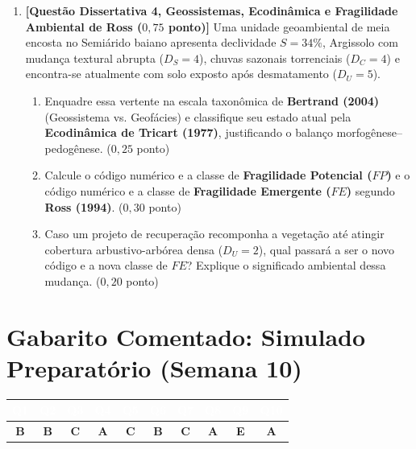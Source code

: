\begin{enumerate}[leftmargin=1.8em, itemsep=6pt, resume]
  \item \textbf{[Questão Dissertativa 4, Geossistemas, Ecodinâmica e Fragilidade Ambiental de Ross ($0{,}75$ ponto)]}
  Uma unidade geoambiental de meia encosta no Semiárido baiano apresenta declividade $S = 34\%$, Argissolo com mudança textural abrupta ($D_S = 4$), chuvas sazonais torrenciais ($D_C = 4$) e encontra-se atualmente com solo exposto após desmatamento ($D_U = 5$).
  \begin{enumerate}[label=(\alph*), leftmargin=1.8em, itemsep=2pt]
    \item Enquadre essa vertente na escala taxonômica de \textbf{Bertrand (2004)} (Geossistema vs. Geofácies) e classifique seu estado atual pela \textbf{Ecodinâmica de Tricart (1977)}, justificando o balanço morfogênese--pedogênese. ($0{,}25$ ponto)
    \item Calcule o código numérico e a classe de \textbf{Fragilidade Potencial ($FP$)} e o código numérico e a classe de \textbf{Fragilidade Emergente ($FE$)} segundo \textbf{Ross (1994)}. ($0{,}30$ ponto)
    \item Caso um projeto de recuperação recomponha a vegetação até atingir cobertura arbustivo-arbórea densa ($D_U = 2$), qual passará a ser o novo código e a nova classe de $FE$? Explique o significado ambiental dessa mudança. ($0{,}20$ ponto)
  \end{enumerate}
  \espacoResolucao[3.8cm]
\end{enumerate}

\clearpage
\section*{Gabarito Comentado: Simulado Preparatório (Semana 10)}

\begin{center}
\renewcommand{\arraystretch}{1.2}
\small
\begin{tabularx}{\textwidth}{@{}c c c c c c c c c c@{}}
  \toprule
  \rowcolor{uefsNavy}
  \textcolor{white}{\bfseries Q1} & \textcolor{white}{\bfseries Q2} & \textcolor{white}{\bfseries Q3} & \textcolor{white}{\bfseries Q4} & \textcolor{white}{\bfseries Q5} & \textcolor{white}{\bfseries Q6} & \textcolor{white}{\bfseries Q7} & \textcolor{white}{\bfseries Q8} & \textcolor{white}{\bfseries Q9} & \textcolor{white}{\bfseries Q10} \\
  \midrule
  \textbf{B} & \textbf{B} & \textbf{C} & \textbf{A} & \textbf{C} & \textbf{B} & \textbf{C} & \textbf{A} & \textbf{E} & \textbf{A} \\
  \bottomrule
\end{tabularx}
\end{center}

